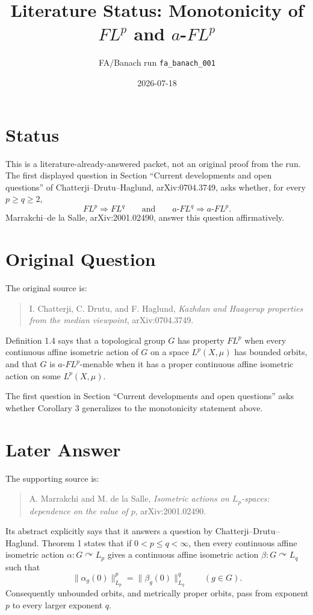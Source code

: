 \documentclass[11pt]{article}
\title{Literature Status: Monotonicity of \texorpdfstring{$FL^p$}{FLp} and \texorpdfstring{$a$-$FL^p$}{a-FLp}}
\author{FA/Banach run \texttt{fa\_banach\_001}}
\date{2026-07-18}
\begin{document}
\maketitle

\section*{Status}

This is a literature-already-answered packet, not an original proof from the
run.  The first displayed question in Section ``Current developments and open
questions'' of Chatterji--Drutu--Haglund, arXiv:0704.3749, asks whether, for
every $p\ge q\ge 2$,
\[
  FL^p \Longrightarrow FL^q
  \qquad\text{and}\qquad
  a\text{-}FL^q \Longrightarrow a\text{-}FL^p .
\]
Marrakchi--de la Salle, arXiv:2001.02490, answer this question
affirmatively.

\section*{Original Question}

The original source is:
\begin{quote}
I. Chatterji, C. Drutu, and F. Haglund,
\emph{Kazhdan and Haagerup properties from the median viewpoint},
arXiv:0704.3749.
\end{quote}
Definition 1.4 says that a topological group $G$ has property $FL^p$ when
every continuous affine isometric action of $G$ on a space $L^p(X,\mu)$ has
bounded orbits, and that $G$ is $a$-$FL^p$-menable when it has a proper
continuous affine isometric action on some $L^p(X,\mu)$.

The first question in Section ``Current developments and open questions''
asks whether Corollary 3 generalizes to the monotonicity statement above.

\section*{Later Answer}

The supporting source is:
\begin{quote}
A. Marrakchi and M. de la Salle,
\emph{Isometric actions on $L_p$-spaces: dependence on the value of $p$},
arXiv:2001.02490.
\end{quote}
Its abstract explicitly says that it answers a question by
Chatterji--Drutu--Haglund.  Theorem 1 states that if $0<p\le q<\infty$, then
every continuous affine isometric action $\alpha:G\curvearrowright L_p$ gives
a continuous affine isometric action $\beta:G\curvearrowright L_q$ such that
\[
  \|\alpha_g(0)\|_{L_p}^p = \|\beta_g(0)\|_{L_q}^q
  \qquad(g\in G).
\]
Consequently unbounded orbits, and metrically proper orbits, pass from
exponent $p$ to every larger exponent $q$.
\end{document}
